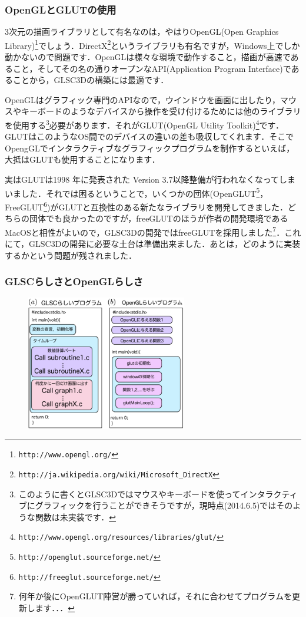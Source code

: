 \documentclass[a4paper,12pt]{jsarticle}%
\begin{document}
\subsubsection{OpenGLとGLUTの使用}
3次元の描画ライブラリとして有名なのは，やはりOpenGL(Open Graphics Library)\footnote{\verb|http://www.opengl.org/|}でしょう．DirectX\footnote{\verb|http://ja.wikipedia.org/wiki/Microsoft_DirectX|}というライブラリも有名ですが，Windows上でしか動かないので問題です．OpenGLは様々な環境で動作すること，描画が高速であること，そしてその名の通りオープンなAPI(Application Program Interface)であることから，GLSC3Dの構築には最適です．

OpenGLはグラフィック専門のAPIなので，ウインドウを画面に出したり，マウスやキーボードのようなデバイスから操作を受け付けるためには他のライブラリを使用する\footnote{このように書くとGLSC3Dではマウスやキーボードを使ってインタラクティブにグラフィックを行うことができそうですが，現時点(2014.6.5)ではそのような関数は未実装です．}必要があります．それがGLUT(OpenGL Utility Toolkit)\footnote{\verb|http://www.opengl.org/resources/libraries/glut/|}です．GLUTはこのようなOS間でのデバイスの違いの差も吸収してくれます．そこでOpengGLでインタラクティブなグラフィックプログラムを制作するといえば，大抵はGLUTも使用することになります．

実はGLUTは1998 年に発表された Version 3.7以降整備が行われなくなってしまいました．それでは困るということで，いくつかの団体(OpenGLUT\footnote{\verb|http://openglut.sourceforge.net/|}，FreeGLUT\footnote{\verb|http://freeglut.sourceforge.net/|})がGLUTと互換性のある新たなライブラリを開発してきました．どちらの団体でも良かったのですが，freeGLUTのほうが作者の開発環境であるMacOSと相性がよいので，GLSC3Dの開発ではfreeGLUTを採用しました\footnote{何年か後にOpenGLUT陣営が勝っていれば，それに合わせてプログラムを更新します．．．}．これにて，GLSC3Dの開発に必要な土台は準備出来ました．あとは，どのように実装するかという問題が残されました．

\subsubsection{GLSCらしさとOpenGLらしさ}

\begin{figure}
\vspace{-1\baselineskip}
	\includegraphics[width=70mm]{./Figures/eps/002.eps}
\end{figure}
\end{document}
